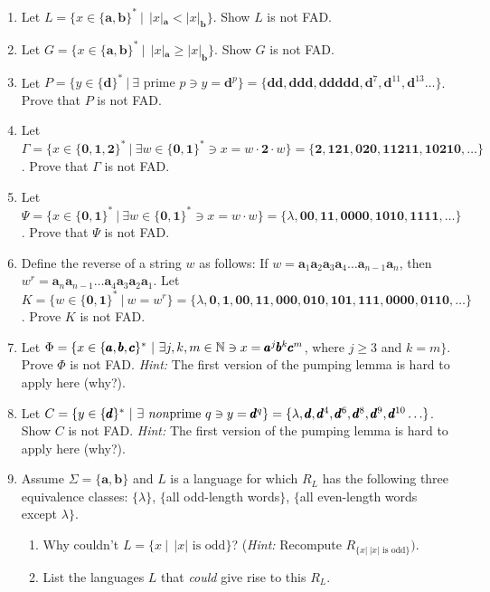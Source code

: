 \begin{enumerate}[{2.}1.]
\item Let $L=\{x \in\{\pmb{a},\pmb{b}\}^*\ |\ \ |x|_{\pmb{a}} < |x|_{\pmb{b}}\}$.
Show $L$ is not FAD.

\item Let $G=\{x \in\{\pmb{a},\pmb{b}\}^*\ |\ \ |x|_{\pmb{a}} \geq |x|_{\pmb{b}}\}$.
Show $G$ is not FAD.

\item Let $P=\{y \in \{\pmb{d}\}^*\ |\ \exists\text{ prime }p \ni y = \pmb{d}^p\} =
\{\pmb{dd},\pmb{ddd},\pmb{ddddd},\pmb{d}^7,\pmb{d}^{11},\pmb{d}^{13}\ldots\}$.
Prove that $P$ is not FAD.

\item Let $\Gamma=\{x \in \{\pmb{0},\pmb{1},\pmb{2}\}^*\ |\ \exists w\in\{\pmb{0},
\pmb{1}\}^* \ni x = w \cdot \pmb{2} \cdot w\} = \{\pmb{2},\pmb{121},\pmb{020},
\pmb{11211},\pmb{10210},\ldots\}$. Prove that $\Gamma$ is not FAD.

\item Let $\Psi=\{x \in \{\pmb{0},\pmb{1}\}^*\ |\ \exists w \in \{\pmb{0},
\pmb{1}\}^* \ni x = w \cdot w\} = \{\lambda,\pmb{00},\pmb{11},\pmb{0000},
\pmb{1010},\pmb{1111}, \ldots \}$. Prove that $\Psi$ is not FAD.

\item Define the reverse of a string $w$ as follows: If $w=\pmb{a}_1\pmb{a}_2
\pmb{a}_3\pmb{a}_4 \ldots \pmb{a}_{n-1}\pmb{a}_n$, then $w^r=\pmb{a}_n
\pmb{a}_{n-1} \ldots \pmb{a}_4\pmb{a}_3\pmb{a}_2\pmb{a}_1$. Let
$K=\{w \in \{\pmb{0},\pmb{1}\}^*\ |\ w = w^r\} = \{\lambda,\pmb{0},\pmb{1},\pmb{00},
\pmb{11},\pmb{000},\pmb{010},\pmb{101},\pmb{111},\pmb{0000},\pmb{0110},\ldots\}$.
Prove $K$ is not FAD.

\item Let $\Phi=\{x \in \{\pmb{a},\pmb{b},\pmb{c}\}^*\ |\ \exists j,k,m \in \mathbb{N} \ni
x = \pmb{a}^j\pmb{b}^k\pmb{c}^m$, where $j \geq 3$ and $k = m\}$. Prove $\Phi$ is
not FAD. \emph{Hint:} The first version of the pumping lemma is hard to apply
here (why?).

\item Let $C=\{y \in \{\pmb{d}\}^*\ |\ \exists\text{ \emph{non}prime }q \ni y =
\pmb{d}^q\} = \{\lambda,\pmb{d},\pmb{d}^4,\pmb{d}^6,\pmb{d}^8,\pmb{d}^9,
\pmb{d}^{10} \ldots \}$. Show $C$ is not FAD. \emph{Hint:} The first version of
the pumping 	lemma is hard to apply here (why?).

\item Assume $\Sigma=\{\pmb{a},\pmb{b}\}$ and $L$ is a language for which $R_L$
has the following three equivalence classes: $\{\lambda\}$, $\{$all odd-length
words$\}$, $\{$all even-length words except $\lambda\}$.
\begin{enumerate}
\item Why couldn't $L=\{x\ |\ \ |x|\text{ is odd}\}$? (\emph{Hint:} Recompute
$R_{\{x|\ |x|\text{ is odd}\}})$.
\item List the languages $L$ that \emph{could} give rise to this $R_L$.
\end{enumerate}


\end{enumerate}
